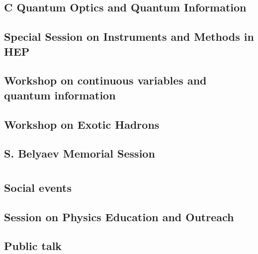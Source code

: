 \subsection{C Quantum Optics and Quantum Information}

\clearpage

\subsection{Special Session on Instruments and Methods in HEP}

\clearpage

\subsection{Workshop on continuous variables and quantum information}

\clearpage

\subsection{Workshop on Exotic Hadrons}

\clearpage

\subsection{S. Belyaev Memorial Session}

\clearpage

\section{}
\subsection{Social events}

\clearpage

\subsection{Session on Physics Education  and Outreach}

\clearpage

\subsection{Public talk}

\clearpage

\section{}
